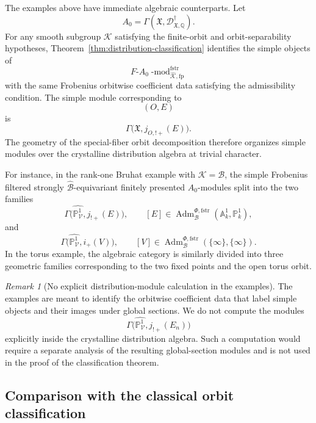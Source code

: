 \documentclass[11pt]{amsart}
\theoremstyle{plain}
\theoremstyle{definition}
\theoremstyle{remark}
\newtheorem{remark}{Remark}[section]
\newcommand{\fstr}{\mathrm{fstr}}
\newcommand{\Adm}{\operatorname{Adm}}
\begin{document}
The examples above have immediate algebraic counterparts. Let
\[
  A_0=\Gamma(\mathfrak X,\mathscr D^\dagger_{\mathfrak X,\mathbb Q}).
\]
For any smooth subgroup \(\mathcal K\) satisfying the finite-orbit and orbit-separability hypotheses,
Theorem~\ref{thm:distribution-classification} identifies the simple objects of
\[
  F\text{-}A_0\operatorname{-mod}^{\fstr}_{\widehat{\mathcal K},\mathrm{fp}}
\]
with the same Frobenius orbitwise coefficient data satisfying the admissibility condition. The simple module corresponding to
\[
  (O,E)
\]
is
\[
  \Gamma\bigl(\mathfrak X,j_{O,!+}(E)\bigr).
\]
The geometry of the special-fiber orbit decomposition therefore organizes
simple modules over the crystalline distribution algebra at trivial character.

For instance, in the rank-one Bruhat example with \(\mathcal K=\mathcal B\),
the simple Frobenius filtered strongly \(\widehat{\mathcal B}\)-equivariant finitely presented
\(A_0\)-modules split into the two families
\[
  \Gamma\bigl(\widehat{\mathbb P^1_{\mathcal V}},
  j_{!+}(E)\bigr),
  \qquad
  [E]\in
  \Adm^{\Phi,\fstr}_{\mathcal B}(\mathbb A^1_k,\mathbb P^1_k),
\]
and
\[
  \Gamma\bigl(\widehat{\mathbb P^1_{\mathcal V}},
  i_+(V)\bigr),
  \qquad
  [V]\in
  \Adm^{\Phi,\fstr}_{\mathcal B}(\{\infty\},\{\infty\}).
\]
In the torus example, the algebraic category is similarly divided into three
geometric families corresponding to the two fixed points and the open torus
orbit.

\begin{remark}[No explicit distribution-module calculation in the examples]
\label{rem:no-explicit-global-section-calculation}
The examples are meant to identify the orbitwise coefficient data that label
simple objects and their images under global sections.  We do not compute the
modules
\[
  \Gamma\bigl(\widehat{\mathbb P^1_{\mathcal V}},j_{!+}(E_n)\bigr)
\]
explicitly inside the crystalline distribution algebra.  Such a computation
would require a separate analysis of the resulting global-section modules and
is not used in the proof of the classification theorem.
\end{remark}


\subsection{Comparison with the classical orbit classification}
\end{document}
